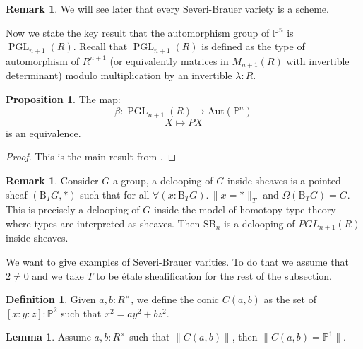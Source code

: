 \documentclass[10pt,a4paper]{article}
\theoremstyle{definition}
\newtheorem{lemma}[theorem]{Lemma}
\newtheorem{definition}[theorem]{Definition}
\newtheorem{remark}[theorem]{Remark}
\newtheorem{proposition}[theorem]{Proposition}
\DeclareMathOperator{\PGL}{PGL}
\newcommand{\SB}{\mathrm{SB}}
\newcommand{\propTrunc}[1]{\lVert #1 \rVert}
\newcommand{\bP}{\mathbb{P}}
\newcommand{\Aut}{\mathrm{Aut}}
\begin{document}
\begin{remark}
We will see later that every Severi-Brauer variety is a scheme. 
\end{remark}

Now we state the key result that the automorphism group of $\bP^n$ is $\PGL_{n+1}(R)$. Recall that $\PGL_{n+1}(R)$ is defined as the type of automorphism of $R^{n+1}$ (or equivalently matrices in $M_{n+1}(R)$ with invertible determinant) modulo multiplication by an invertible $\lambda:R$.

\begin{proposition}\label{Aut-Pn-PGL}
The map:
\[\beta:\PGL_{n+1}(R)\to\Aut(\bP^n)\]
\[X\mapsto PX\]
is an equivalence.
\end{proposition}

\begin{proof}
This is the main result from \cite{sag-projective}.
\end{proof}

\begin{remark}\label{SB-is-delooping}
Consider $G$ a group, a delooping of $G$ inside sheaves is a pointed sheaf $(\mathrm{B}_TG,*)$ such that for all $\forall(x:\mathrm{B}_TG).\, \propTrunc{x=*}_T$ and $\Omega (\mathrm{B}_TG) = G$. This is precisely a delooping of $G$ inside the model of homotopy type theory where types are interpreted as sheaves. Then $\SB_n$ is a delooping of $PGL_{n+1}(R)$ inside sheaves.
\end{remark}

We want to give examples of Severi-Brauer varities. To do that we assume that $2\not=0$ and we take $T$ to be étale sheafification for the rest of the subsection.

\begin{definition}
Given $a,b:R^\times$, we define the conic $C(a,b)$ as the set of $[x:y:z]:\bP^2$ such that $x^2=ay^2+bz^2$.
\end{definition}

\begin{lemma}\label{pointed-conics-projective}
Assume $a,b:R^\times$ such that $\propTrunc{C(a,b)}$, then $\propTrunc{C(a,b)=\bP^1}$.
\end{lemma}
\end{document}
